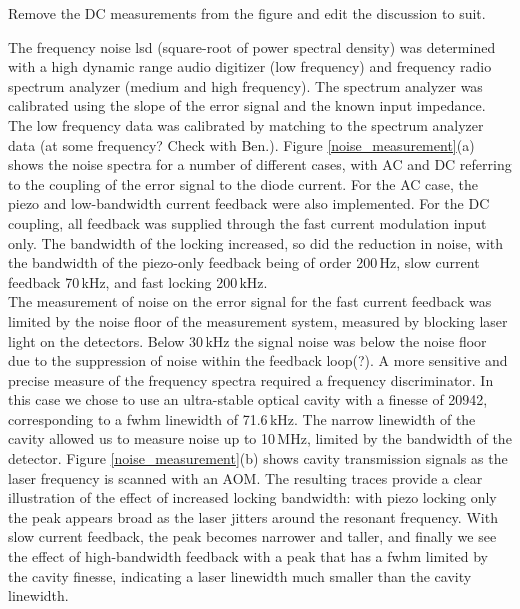 \documentclass{article}
\begin{document}
\begin{multicols}{2}
{\color{red} Remove the DC measurements from the figure and edit the discussion to suit.}


The frequency noise \gls*{lsd} (square-root of power spectral density) was determined with a high dynamic range audio digitizer (low frequency) and frequency radio spectrum analyzer (medium and high frequency). The spectrum analyzer was calibrated using the slope of the error signal and the known input impedance. The low frequency data was calibrated by matching to the spectrum analyzer data {\color{red}(at some frequency? Check with Ben.)}. Figure \ref{noise_measurement}(a) shows the noise spectra for a number of different cases, with AC and DC referring to the coupling of the error signal to the diode current. For the AC case, the piezo and low-bandwidth current feedback were also implemented. For the DC coupling, all feedback was supplied through the fast current modulation input only. The bandwidth of the locking increased, so did the reduction in noise, with the bandwidth of the piezo-only feedback being of order 200\,Hz, slow current feedback 70\,kHz, and fast locking 200\,kHz.\\

The measurement of noise on the error signal for the fast current feedback was limited by the noise floor of the measurement system, measured by blocking laser light on the detectors. Below 30\,kHz the signal noise was below the noise floor due {\color{red}to the suppression of noise within the feedback loop(?)}. A more sensitive and precise measure of the frequency spectra required a frequency discriminator. In this case we chose to use an ultra-stable optical cavity with a finesse of 20942, corresponding to a \gls*{fwhm} linewidth of 71.6\,kHz. The narrow linewidth of the cavity allowed us to measure noise up to 10\,MHz, limited by the bandwidth of the detector. Figure \ref{noise_measurement}(b) shows cavity transmission signals as the laser frequency is scanned with an AOM. The resulting traces provide a clear illustration of the effect of increased locking bandwidth: with piezo locking only the peak appears broad as the laser jitters around the resonant frequency. With slow current feedback, the peak becomes narrower and taller, and finally we see the effect of high-bandwidth feedback with a peak that has a \gls*{fwhm} limited by the cavity finesse, indicating a laser linewidth much smaller than the cavity linewidth.\\


\end{multicols}
\end{document}
